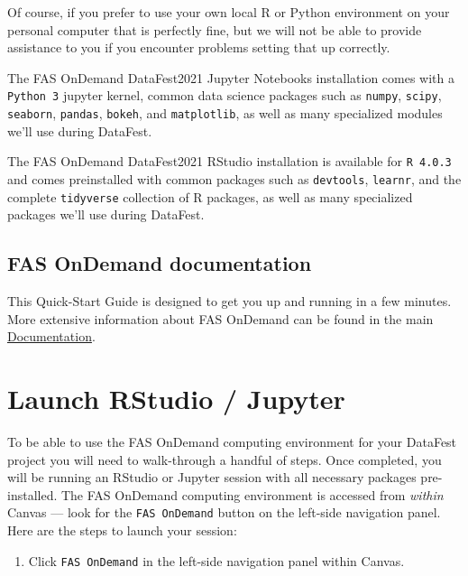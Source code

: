 \documentclass[]{book}
\providecommand{\tightlist}{%
  \setlength{\itemsep}{0pt}\setlength{\parskip}{0pt}}
\begin{document}
Of course, if you prefer to use your own local R or Python environment on your personal computer that is perfectly fine, but we will not be able to provide assistance to you if you encounter problems setting that up correctly.

The FAS OnDemand DataFest2021 Jupyter Notebooks installation comes with a \texttt{Python\ 3} jupyter kernel, common data science packages such as \texttt{numpy}, \texttt{scipy}, \texttt{seaborn}, \texttt{pandas}, \texttt{bokeh}, and \texttt{matplotlib}, as well as many specialized modules we'll use during DataFest.

The FAS OnDemand DataFest2021 RStudio installation is available for \texttt{R\ 4.0.3} and comes preinstalled with common packages such as \texttt{devtools}, \texttt{learnr}, and the complete \texttt{tidyverse} collection of R packages, as well as many specialized packages we'll use during DataFest.

\hypertarget{fas-ondemand-documentation}{%
\section{FAS OnDemand documentation}\label{fas-ondemand-documentation}}

This Quick-Start Guide is designed to get you up and running in a few minutes. More extensive information about FAS OnDemand can be found in the main \href{https://academic-login.rc.fas.harvard.edu/pun/sys/dashboard/}{Documentation}.

\hypertarget{launch-rstudio-jupyter}{%
\chapter*{Launch RStudio / Jupyter}\label{launch-rstudio-jupyter}}

To be able to use the FAS OnDemand computing environment for your DataFest project you will need to walk-through a handful of steps. Once completed, you will be running an RStudio or Jupyter session with all necessary packages pre-installed. The FAS OnDemand computing environment is accessed from \emph{within} Canvas --- look for the \texttt{FAS\ OnDemand} button on the left-side navigation panel. Here are the steps to launch your session:

\begin{enumerate}
\def\labelenumi{\arabic{enumi}.}
\tightlist
\item
  Click \texttt{FAS\ OnDemand} in the left-side navigation panel within Canvas.
\end{enumerate}
\end{document}
